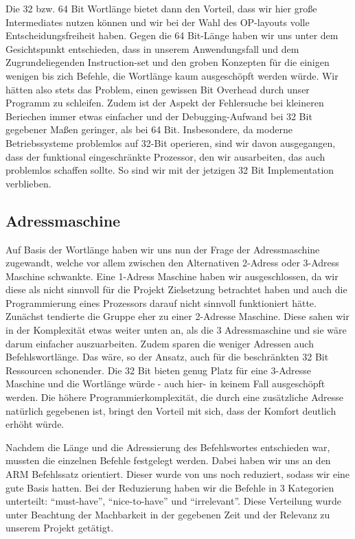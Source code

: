 \documentclass[paper=a4,fontsize=12pt]{scrreprt}
\begin{document}
Die 32 bzw. 64 Bit Wortlänge bietet dann den Vorteil, dass wir hier große Intermediates nutzen können und wir bei der Wahl des OP-layouts volle Entscheidungsfreiheit haben.
Gegen die 64 Bit-Länge haben wir uns unter dem Gesichtspunkt entschieden, dass in unserem Anwendungsfall und dem Zugrundeliegenden Instruction-set und den groben Konzepten für die einigen wenigen bis zich Befehle, die Wortlänge kaum ausgeschöpft werden würde. Wir hätten also stets das Problem, einen gewissen Bit Overhead durch unser Programm zu schleifen. Zudem ist der Aspekt der Fehlersuche bei kleineren Beriechen immer etwas einfacher und der Debugging-Aufwand bei 32 Bit gegebener Maßen geringer, als bei 64 Bit.
Insbesondere, da moderne Betriebssysteme problemlos auf 32-Bit operieren, sind wir davon ausgegangen, dass der funktional eingeschränkte Prozessor, den wir ausarbeiten, das auch problemlos schaffen sollte. So sind wir mit der jetzigen 32 Bit Implementation verblieben.

\subsection{Adressmaschine}

Auf Basis der Wortlänge haben wir uns nun der Frage der Adressmaschine zugewandt, welche vor allem zwischen den Alternativen 2-Adress oder 3-Adress Maschine schwankte. Eine 1-Adress Maschine haben wir ausgeschlossen, da wir diese als nicht sinnvoll für die Projekt Zielsetzung betrachtet haben und auch die Programmierung eines Prozessors darauf nicht sinnvoll funktioniert hätte.
Zunächst tendierte die Gruppe eher zu einer 2-Adresse Maschine. Diese sahen wir in der Komplexität etwas weiter unten an, als die 3 Adressmaschine und sie wäre darum einfacher auszuarbeiten. Zudem sparen die weniger Adressen auch Befehlswortlänge. Das wäre, so der Ansatz, auch für die beschränkten 32 Bit Ressourcen schonender.
Die 32 Bit bieten genug Platz für eine 3-Adresse Maschine und die Wortlänge würde - auch hier- in keinem Fall ausgeschöpft werden.
Die höhere Programmierkomplexität, die durch eine zusätzliche Adresse natürlich gegebenen ist, bringt den Vorteil mit sich, dass der Komfort deutlich erhöht würde.

Nachdem die Länge und die Adressierung des Befehlswortes entschieden war, mussten die einzelnen Befehle festgelegt werden. Dabei haben wir uns an den ARM Befehlssatz orientiert\footnotemark.
Dieser wurde von uns noch reduziert, sodass wir eine gute Basis hatten. Bei der Reduzierung haben wir die Befehle in 3 Kategorien unterteilt: \enquote{must-have}, \enquote{nice-to-have} und \enquote{irrelevant}. Diese Verteilung wurde unter Beachtung der Machbarkeit in der gegebenen Zeit und der Relevanz zu unserem Projekt getätigt.
\end{document}
